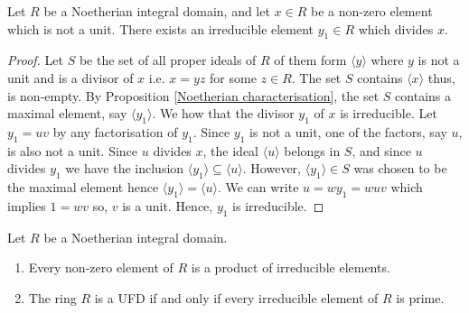 \documentclass[12pt, a4paper]{article}
\begin{document}
\begin{lemma}
    Let \(R\) be a Noetherian integral domain, and let \(x\in R\) be a non-zero element which is not a unit. There exists an irreducible element \(y_1\in R\) which divides \(x\).
\end{lemma}

\begin{proof}
    Let \(S\) be the set of all proper ideals of \(R\) of them form \(\langle y \rangle\) where \(y\) is not a unit and is a divisor of \(x\) i.e. \(x=yz\) for some \(z\in R\). The set \(S\) contains \(\langle x\rangle\) thus, is non-empty. By Proposition \ref{Noetherian characterisation}, the set \(S\) contains a maximal element, say \(\langle y_1 \rangle\). We how that the divisor \(y_1\) of \(x\) is irreducible. Let \(y_1=uv\) by any factorisation of \(y_1\). Since \(y_1\) is not a unit, one of the factors, say \(u\), is also not a unit. Since \(u\) divides \(x\), the ideal \(\langle u \rangle\) belongs in \(S\), and since \(u\) divides \(y_1\) we have the inclusion \(\langle y_1 \rangle \subseteq \langle u\rangle\). However, \(\langle y_1 \rangle \in S\) was chosen to be the maximal element hence \(\langle y_1 \rangle =\langle u \rangle\). We can write \(u=wy_1 =wuv\) which implies \(1 =wv\) so, \(v\) is a unit. Hence, \(y_1\) is irreducible.
\end{proof}

\begin{mdprop}\label{Noetherian irreducible/UFD}
    Let \(R\) be a Noetherian integral domain.
    \begin{enumerate}
        \item Every non-zero element of \(R\) is a product of irreducible elements.
        \item The ring \(R\) is a UFD if and only if every irreducible element of \(R\) is prime.
    \end{enumerate}
\end{mdprop}
\end{document}
